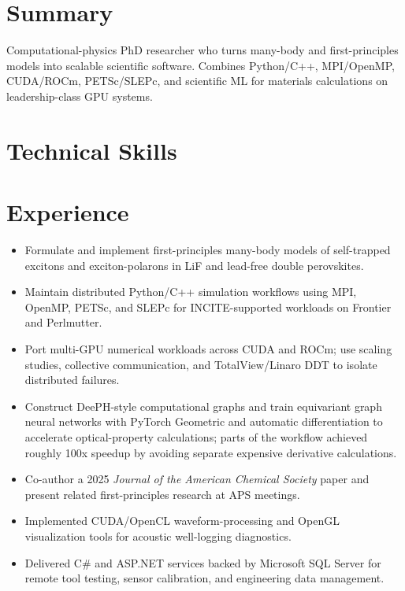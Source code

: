 \section{Summary}
Computational-physics PhD researcher who turns many-body and first-principles models into scalable scientific software. Combines Python/C++, MPI/OpenMP, CUDA/ROCm, PETSc/SLEPc, and scientific ML for materials calculations on leadership-class GPU systems.

\section{Technical Skills}

\section{Experience}
\begin{itemize}
\item Formulate and implement first-principles many-body models of self-trapped excitons and exciton-polarons in LiF and lead-free double perovskites.
\item Maintain distributed Python/C++ simulation workflows using MPI, OpenMP, PETSc, and SLEPc for INCITE-supported workloads on Frontier and Perlmutter.
\item Port multi-GPU numerical workloads across CUDA and ROCm; use scaling studies, collective communication, and TotalView/Linaro DDT to isolate distributed failures.
\item Construct DeePH-style computational graphs and train equivariant graph neural networks with PyTorch Geometric and automatic differentiation to accelerate optical-property calculations; parts of the workflow achieved roughly 100x speedup by avoiding separate expensive derivative calculations.
\item Co-author a 2025 \textit{Journal of the American Chemical Society} paper and present related first-principles research at APS meetings.
\end{itemize}
\begin{itemize}
\item Implemented CUDA/OpenCL waveform-processing and OpenGL visualization tools for acoustic well-logging diagnostics.
\item Delivered C\# and ASP.NET services backed by Microsoft SQL Server for remote tool testing, sensor calibration, and engineering data management.
\end{itemize}

